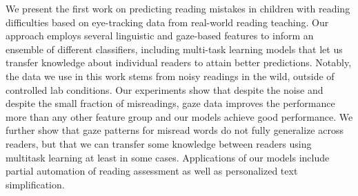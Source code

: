 We present the first work on predicting reading mistakes in children with reading difficulties based on eye-tracking data from real-world reading teaching. Our approach employs several linguistic and gaze-based features to inform an ensemble of different classifiers, including multi-task learning models that let us transfer knowledge about individual readers to attain better predictions. Notably, the data we use in this work stems from noisy readings in the wild, outside of controlled lab conditions. Our experiments show that despite the noise and despite the small fraction of misreadings, gaze data improves the performance more than any other feature group and our models achieve good performance. We further show that gaze patterns for misread words do not fully generalize across readers, but that we can transfer some knowledge between readers using multitask learning at least in some cases. Applications of our models include partial automation of reading assessment as well as personalized text simplification.
